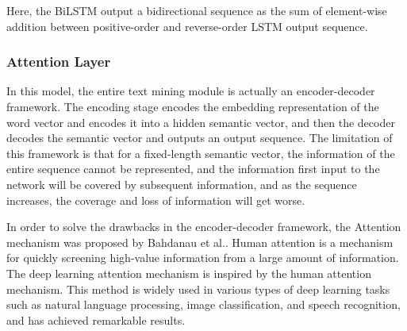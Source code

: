 Here, the BiLSTM output a bidirectional sequence as the sum of element-wise addition between positive-order and reverse-order LSTM output sequence.

\subsubsection{Attention Layer}




In this model, the entire text mining module is actually an encoder-decoder framework. The encoding stage encodes the embedding representation of the word vector and encodes it into a hidden semantic vector, and then the decoder decodes the semantic vector and outputs an output sequence. The limitation of this framework is that for a fixed-length semantic vector, the information of the entire sequence cannot be represented, and the information first input to the network will be covered by subsequent information, and as the sequence increases, the coverage and loss of information will get worse.

In order to solve the drawbacks in the encoder-decoder framework, the Attention mechanism was proposed by Bahdanau et al.\cite{bahdanau2014neural}. Human attention is a mechanism for quickly screening high-value information from a large amount of information. The deep learning attention mechanism is inspired by the human attention mechanism. This method is widely used in various types of deep learning tasks such as natural language processing\cite{hu2019introductory}, image classification\cite{fu2017look,sun2018multi}, and speech recognition\cite{chorowski2015attention}, and has achieved remarkable results.

